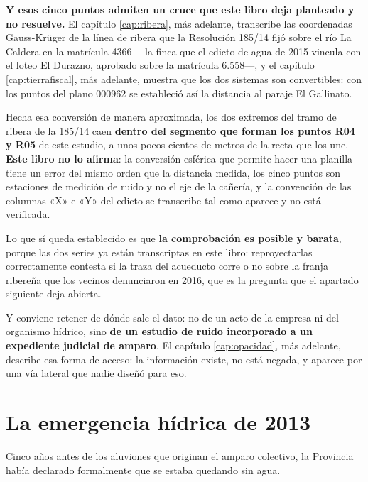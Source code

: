 \begin{cautela}
\textbf{Y esos cinco puntos admiten un cruce que este libro deja planteado y no resuelve.} El
capítulo \ref{cap:ribera}, más adelante, transcribe las coordenadas Gauss-Krüger de la línea de ribera que la
Resolución 185/14 fijó sobre el río La Caldera en la matrícula 4366 ---la finca que el edicto de agua de 2015 vincula con
el loteo El Durazno, aprobado sobre la matrícula 6.558---, y el capítulo \ref{cap:tierrafiscal}, más adelante, muestra que los dos sistemas son
convertibles: con los puntos del plano 000962 se estableció así la distancia al paraje El
Gallinato.

Hecha esa conversión de manera aproximada, los dos extremos del tramo de ribera de la 185/14
caen \textbf{dentro del segmento que forman los puntos R04 y R05} de este estudio, a unos pocos
cientos de metros de la recta que los une. \textbf{Este libro no lo afirma}: la conversión
esférica que permite hacer una planilla tiene un error del mismo orden que la distancia medida,
los cinco puntos son estaciones de medición de ruido y no el eje de la cañería, y la convención
de las columnas «X» e «Y» del edicto se transcribe tal como aparece y no está verificada.

Lo que sí queda establecido es que \textbf{la comprobación es posible y barata}, porque las dos
series ya están transcriptas en este libro: reproyectarlas correctamente contesta si la traza
del acueducto corre o no sobre la franja ribereña que los vecinos denunciaron en 2016, que es
la pregunta que el apartado siguiente deja abierta. 
\end{cautela}

Y conviene retener de dónde sale el dato: no de un acto de la empresa ni del organismo
hídrico, sino \textbf{de un estudio de ruido incorporado a un expediente judicial de amparo}.
El capítulo \ref{cap:opacidad}, más adelante, describe esa forma de acceso: la información existe, no está negada, y aparece
por una vía lateral que nadie diseñó para eso.

\section{La emergencia hídrica de 2013}

Cinco años antes de los aluviones que originan el amparo colectivo, la Provincia había declarado formalmente que se estaba quedando sin agua.

